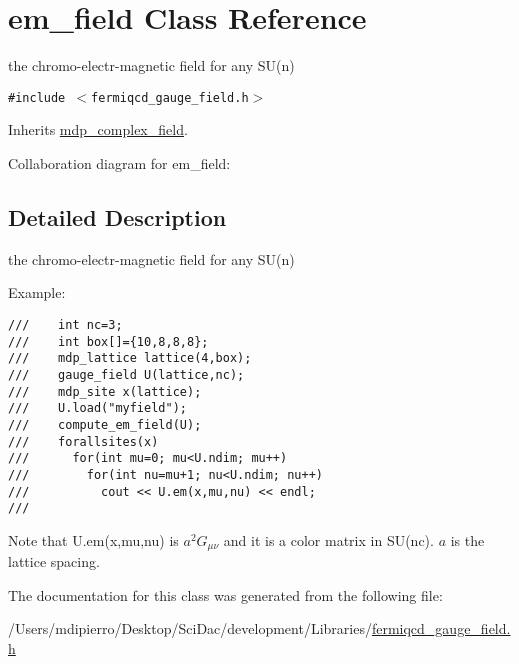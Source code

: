 \hypertarget{classem__field}{
\section{em\_\-field Class Reference}
\label{classem__field}
}
the chromo-electr-magnetic field for any SU(n)  


{\tt \#include $<$fermiqcd\_\-gauge\_\-field.h$>$}

Inherits \hyperlink{classmdp__complex__field}{mdp\_\-complex\_\-field}.

Collaboration diagram for em\_\-field:

\subsection{Detailed Description}
the chromo-electr-magnetic field for any SU(n) 

Example: 

\footnotesize\begin{verbatim}
///    int nc=3; 
///    int box[]={10,8,8,8};
///    mdp_lattice lattice(4,box);
///    gauge_field U(lattice,nc);
///    mdp_site x(lattice);
///    U.load("myfield");
///    compute_em_field(U);
///    forallsites(x)
///      for(int mu=0; mu<U.ndim; mu++)
///        for(int nu=mu+1; nu<U.ndim; nu++)
///          cout << U.em(x,mu,nu) << endl;
/// \end{verbatim}
\normalsize
 Note that U.em(x,mu,nu) is $ a^2 G_{\mu\nu} $ and it is a color matrix in SU(nc). $a$ is the lattice spacing. 

The documentation for this class was generated from the following file:\begin{CompactItemize}
\item 
/Users/mdipierro/Desktop/SciDac/development/Libraries/\hyperlink{fermiqcd__gauge__field_8h}{fermiqcd\_\-gauge\_\-field.h}\end{CompactItemize}
